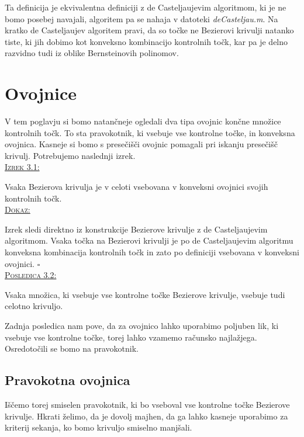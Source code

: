 \documentclass[a4paper, 12pt]{article} %
\newenvironment{matematika}[1]{
{\underline{\textsc{#1:}}}
}{
}
\begin{document}
Ta definicija je ekvivalentna definiciji z de Casteljaujevim algoritmom, ki je ne bomo posebej navajali, algoritem pa se nahaja v datoteki \emph{deCasteljau.m}. Na kratko de Casteljaujev algoritem pravi, da so točke ne Bezierovi krivulji natanko tiste, ki jih dobimo kot konveksno kombinacijo kontrolnih točk, kar pa je delno razvidno tudi iz oblike Bernsteinovih polinomov.
\section{Ovojnice}

V tem poglavju si bomo natančneje ogledali dva tipa ovojnic končne množice kontrolnih točk. To sta pravokotnik, ki vsebuje vse kontrolne točke, in konveksna ovojnica. Kasneje si bomo s presečišči ovojnic pomagali pri iskanju presečišč krivulj. Potrebujemo naslednji izrek.\\
\begin{matematika}{Izrek 3.1}
Vsaka Bezierova krivulja je v celoti vsebovana v konveksni ovojnici svojih kontrolnih točk.\\
\end{matematika}
\begin{matematika}{Dokaz}
Izrek sledi direktno iz konstrukcije Bezierove krivulje z de Casteljaujevim algoritmom. Vsaka točka na Bezierovi krivulji je po de Casteljaujevim algoritmu konveksna kombinacija kontrolnih točk in zato po definiciji vsebovana v konveksni ovojnici. \hspace*{\fill} $\square$\\
\end{matematika}
\begin{matematika}{Posledica 3.2}
Vsaka množica, ki vsebuje vse kontrolne točke Bezierove krivulje, vsebuje tudi celotno krivuljo.
\end{matematika}

Zadnja posledica nam pove, da za ovojnico lahko uporabimo poljuben lik, ki vsebuje vse kontrolne točke, torej lahko vzamemo računsko najlažjega. Osredotočili se bomo na pravokotnik.

\subsection{Pravokotna ovojnica}
Iščemo torej smiselen pravokotnik, ki bo vseboval vse kontrolne točke Bezierove krivulje. Hkrati želimo, da je dovolj majhen, da ga lahko kasneje uporabimo za kriterij sekanja, ko bomo krivuljo smiselno manjšali.
\end{document}
